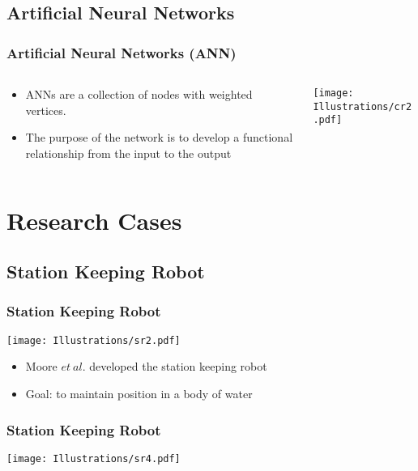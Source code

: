 \documentclass{beamer}
\begin{document}
\begin{frame}
\subsection{Artificial Neural Networks}
\begin{frame}
  \frametitle{Artificial Neural Networks (ANN)}
\begin{columns}
  \begin{column}{0.5\textwidth}
\begin{itemize}
\item  ANNs are a collection of nodes with weighted vertices.
\item The purpose of the network is to develop a functional relationship from the input to the output
\end{itemize}
\end{column}
\begin{column}{0.5\textwidth}
 \texttt{[image: Illustrations/cr2.pdf]}
       \\
\end{column}
\end{columns}
\end{frame}

\section{Research Cases}

\subsection{Station Keeping Robot}
\begin{frame}
  \frametitle{Station Keeping Robot}
\begin{center}
 \texttt{[image: Illustrations/sr2.pdf]}
       \\
\end{center}
\begin{itemize}
\item \large Moore $et~al.$ developed the station keeping robot
\item \large Goal: to maintain position in a body of water
\end{itemize}
\end{frame}

\begin{frame}
  \frametitle{Station Keeping Robot}
\begin{center}
 \texttt{[image: Illustrations/sr4.pdf]}
       \\
\end{center}


\end{frame}
\end{frame}
\end{document}
